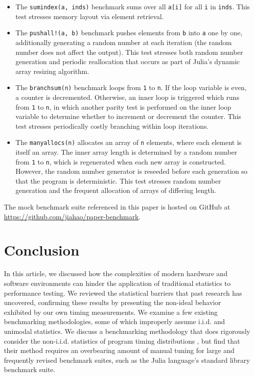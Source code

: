 \documentclass[conference]{IEEEtran}
\begin{document}
\begin{itemize}
    \item The \lstinline|sumindex(a, inds)| benchmark sums over all \lstinline|a[i]| for all
    \lstinline|i| in \lstinline|inds|. This test stresses memory layout via element
    retrieval.
    \item The \lstinline|pushall!(a, b)| benchmark pushes elements from \lstinline|b| into
    \lstinline|a| one by one, additionally generating a random number at each iteration (the
    random number does not affect the output). This test stresses both random number
    generation and periodic reallocation that occurs as part of Julia's dynamic array
    resizing algorithm.
    \item The \lstinline|branchsum(n)| benchmark loops from \lstinline|1| to \lstinline|n|.
    If the loop variable is even, a counter is decremented. Otherwise, an inner loop is
    triggered which runs from \lstinline|1| to \lstinline|n|, in which another parity test
    is performed on the inner loop variable to determine whether to increment or decrement
    the counter. This test stresses periodically costly branching within loop iterations.
    \item The \lstinline|manyallocs(n)| allocates an array of \lstinline|n| elements, where
    each element is itself an array. The inner array length is determined by a random number
    from \lstinline|1| to \lstinline|n|, which is regenerated when each new array is
    constructed. However, the random number generator is reseeded before each generation so
    that the program is deterministic. This test stresses random number generation and
    the frequent allocation of arrays of differing length.
\end{itemize}

The mock benchmark suite referenced in this paper is hosted on GitHub at
\url{https://github.com/jiahao/paper-benchmark}.

\label{sec:conclusion}
\section*{Conclusion}

In this article, we discussed how the complexities of modern hardware and software
environments can hinder the application of traditional statistics to performance testing. We
reviewed the statistical barriers that past research has uncovered, confirming these
results by presenting the non-ideal behavior exhibited by our own timing measurements. We
examine a few existing benchmarking methodologies, some of which improperly assume i.i.d.
and unimodal statistics. We discuss a benchmarking methodology that does rigorously consider
the non-i.i.d. statistics of program timing distributions \cite{Kalibera2013}, but find that
their method requires an overbearing amount of manual tuning for large and frequently
revised benchmark suites, such as the Julia language's standard library benchmark suite.
\end{document}
